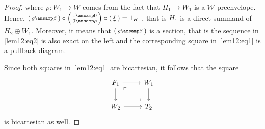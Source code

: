 \begin{proof}
  where $\rho:W_1\to W$ comes from the fact that $H_1\to W_1$ is a $\mathcal{W}$-preenvelope. Hence,
  $
    \begin{psmallmatrix}
      g\amsamp \beta
    \end{psmallmatrix}
    \circ
    \begin{psmallmatrix}
      1 \amsamp 0\\
      0 \amsamp \rho
    \end{psmallmatrix}
    \circ
    \begin{psmallmatrix}
      f \\ r
    \end{psmallmatrix}
    = 1_{H_1}
  $, that is $H_1$ is a direct summand of $H_2\oplus W_1$. Moreover, it means that
  $
    \begin{psmallmatrix}
      g\amsamp \beta
    \end{psmallmatrix}
  $ is a section, that is the sequence in \eqref{lem12:eq2} is also exact on the left and
  the corresponding square in \eqref{lem12:eq1} is a pullback diagram.

  Since both squares in \eqref{lem12:eq1} are bicartesian, it follows that the square
  \begin{equation*}
    \begin{tikzcd}
      F_1\arrow{r}\arrow{d}
        \arrow[phantom,"\ulcorner",very near start]{dr}
        \arrow[phantom,"\lrcorner",very near end]{dr}
        & W_1\arrow{d}\\
      W_2\arrow{r}& T_2
    \end{tikzcd}
  \end{equation*}
  is bicartesian as well.
\end{proof}

